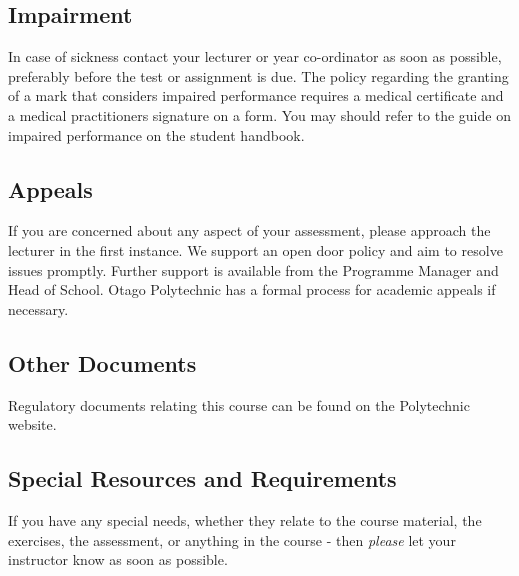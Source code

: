 \documentclass{article}
\begin{document}
\subsection*{Impairment}
In case of sickness contact your lecturer or year co-ordinator as soon as possible, preferably before the test or
assignment is due.  The policy regarding the granting of a mark that considers impaired performance requires a medical
certificate and a medical practitioners signature on a form. You may should refer to the guide on impaired performance
on the student handbook.

\subsection*{Appeals}
If you are concerned about any aspect of your assessment, please approach the lecturer in the first instance.  We support
an open door policy and aim to resolve issues promptly.  Further support is available from the Programme
Manager and Head of School. Otago Polytechnic has a formal process for academic appeals if necessary.

\subsection*{Other Documents}
Regulatory documents relating this course can be found on the Polytechnic website.

\subsection*{Special Resources and Requirements}
If you have any special needs, whether they relate to the course material, the exercises, the assessment, or anything in the course -
then \textit{please} let your instructor know as soon as possible.
\end{document}
